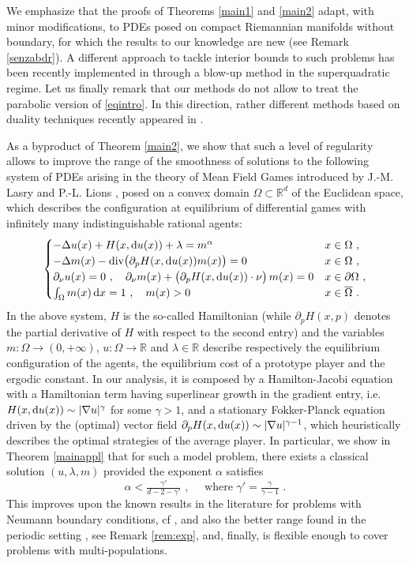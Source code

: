\documentclass[10pt, a4paper, reqno, oneside]{amsart}
\theoremstyle{plain}
\theoremstyle{definition}
\theoremstyle{plain}
\theoremstyle{definition}
\theoremstyle{plain}
\renewcommand{\=}{:=}
\begin{document}
We emphasize that the proofs of Theorems \ref{main1} and \ref{main2} adapt, with minor modifications, to PDEs posed on compact Riemannian manifolds without boundary, for which the results to our knowledge are new (see Remark \ref{senzabdr}). A different approach to tackle interior bounds to such problems has been recently implemented in \cite{CV} through a blow-up method in the superquadratic regime. Let us finally remark that our methods do not allow to treat the parabolic version of \eqref{eqintro}. In this direction, rather different methods based on duality techniques recently appeared in \cite{CG2,CGpar}. \smallskip

As a byproduct of Theorem \ref{main2}, we show that such a level of regularity allows to improve the range of the smoothness of solutions to the following system of PDEs arising in the theory of Mean Field Games introduced by J.-M. Lasry and P.-L. Lions \cite{LL07}, posed on a convex domain $\Omega \subset \mathbb{R}^d$ of the Euclidean space, which describes the configuration at equilibrium of differential games with infinitely many indistinguishable rational agents:
\begin{equation*} \label{mfgintro}
\begin{cases}
-\Delta u(x) +H(x,{\rm d}u(x))+\lambda = m^\alpha & x \in \Omega \,\, , \\
-\Delta m(x) -\mathrm{div}\big(\partial_pH(x,{\rm d}u(x))m(x)\big)=0 & x \in \Omega \,\, , \\
\partial_\nu u (x) =0 \,\, , \quad \partial_\nu m(x) +\big(\partial_pH(x,{\rm d}u(x)) \cdot \nu\big)\,m(x) =0 & x \in \partial \Omega \,\, , \\
\int_\Omega m(x)\,{\rm d}x=1\ , \quad m(x)>0 & x \in \overline{\Omega} \,\, .
\end{cases}
\end{equation*}
In the above system, $H$ is the so-called Hamiltonian (while $\partial_pH(x,p)$ denotes the partial derivative of $H$ with respect to the second entry) and the variables $m: \Omega \to (0,+\infty)$, $u: \Omega \to \mathbb{R}$ and $\lambda \in \mathbb{R}$ describe respectively the equilibrium configuration of the agents, the equilibrium cost of a prototype player and the ergodic constant.
In our analysis, it is composed by a Hamilton-Jacobi equation with a Hamiltonian term having superlinear growth in the gradient entry, i.e. $H(x,{\rm d}u(x)) \sim |\nabla u|^{\gamma}$ for some $\gamma>1$, and a stationary Fokker-Planck equation driven by the (optimal) vector field $\partial_pH(x,{\rm d}u(x))\sim |\nabla u|^{\gamma-1} $, which heuristically describes the optimal strategies of the average player. In particular, we show in Theorem \ref{mainappl} that for such a model problem, there exists a classical solution $(u,\lambda,m)$ provided the exponent $\alpha$ satisfies
$$
\alpha < \tfrac{\gamma'}{d-2-\gamma'} \,\, , \quad \text{ where } \gamma' = \tfrac{\gamma}{\gamma-1} \,\, .
$$
This improves upon the known results in the literature for problems with Neumann boundary conditions, cf \cite{CirantJMPA,Alpar}, and also the better range found in the periodic setting \cite{CCPDE}, see Remark \ref{rem:exp}, and, finally, is flexible enough to cover problems with multi-populations.
\end{document}
